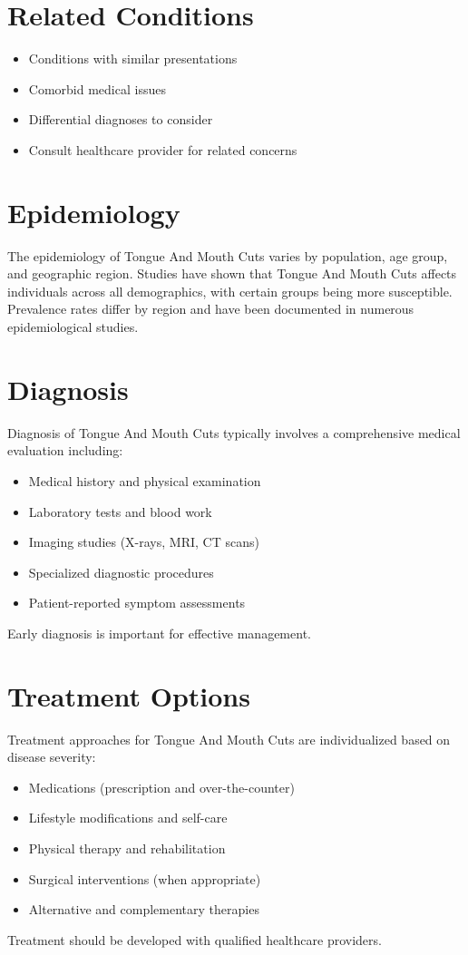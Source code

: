 \section*{Related Conditions}
\begin{itemize}
  \item Conditions with similar presentations
  \item Comorbid medical issues
  \item Differential diagnoses to consider
  \item Consult healthcare provider for related concerns
\end{itemize}

\section*{Epidemiology}
The epidemiology of Tongue And Mouth Cuts varies by population, age group, and geographic region. Studies have shown that Tongue And Mouth Cuts affects individuals across all demographics, with certain groups being more susceptible. Prevalence rates differ by region and have been documented in numerous epidemiological studies.

\section*{Diagnosis}
Diagnosis of Tongue And Mouth Cuts typically involves a comprehensive medical evaluation including:
\begin{itemize}
  \item Medical history and physical examination
  \item Laboratory tests and blood work
  \item Imaging studies (X-rays, MRI, CT scans)
  \item Specialized diagnostic procedures
  \item Patient-reported symptom assessments
\end{itemize}
Early diagnosis is important for effective management.

\section*{Treatment Options}
Treatment approaches for Tongue And Mouth Cuts are individualized based on disease severity:
\begin{itemize}
  \item Medications (prescription and over-the-counter)
  \item Lifestyle modifications and self-care
  \item Physical therapy and rehabilitation
  \item Surgical interventions (when appropriate)
  \item Alternative and complementary therapies
\end{itemize}
Treatment should be developed with qualified healthcare providers.

